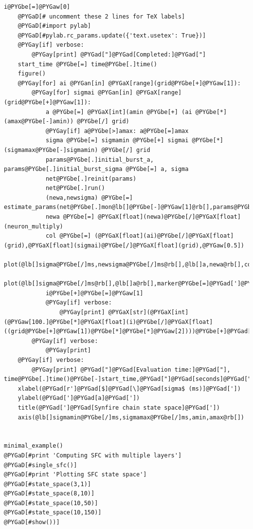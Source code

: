 \documentclass[letterpaper,10pt]{manual}
\begin{document}
\begin{Verbatim}[commandchars=@\[\]]
    i@PYGbe[=]@PYGaw[0]
    @PYGaD[# uncomment these 2 lines for TeX labels]
    @PYGaD[#import pylab]
    @PYGaD[#pylab.rc_params.update({'text.usetex': True})]
    @PYGay[if] verbose:
        @PYGay[print] @PYGad["]@PYGad[Completed:]@PYGad["]
    start_time @PYGbe[=] time@PYGbe[.]time()
    figure()
    @PYGay[for] ai @PYGan[in] @PYGaX[range](grid@PYGbe[+]@PYGaw[1]):
        @PYGay[for] sigmai @PYGan[in] @PYGaX[range](grid@PYGbe[+]@PYGaw[1]):
            a @PYGbe[=] @PYGaX[int](amin @PYGbe[+] (ai @PYGbe[*] (amax@PYGbe[-]amin)) @PYGbe[/] grid)
            @PYGay[if] a@PYGbe[>]amax: a@PYGbe[=]amax
            sigma @PYGbe[=] sigmamin @PYGbe[+] sigmai @PYGbe[*] (sigmamax@PYGbe[-]sigmamin) @PYGbe[/] grid
            params@PYGbe[.]initial_burst_a, params@PYGbe[.]initial_burst_sigma @PYGbe[=] a, sigma
            net@PYGbe[.]reinit(params)
            net@PYGbe[.]run()
            (newa,newsigma) @PYGbe[=] estimate_params(net@PYGbe[.]mon@lb[]@PYGbe[-]@PYGaw[1]@rb[],params@PYGbe[.]initial_burst_t)
            newa @PYGbe[=] @PYGaX[float](newa)@PYGbe[/]@PYGaX[float](neuron_multiply)
            col @PYGbe[=] (@PYGaX[float](ai)@PYGbe[/]@PYGaX[float](grid),@PYGaX[float](sigmai)@PYGbe[/]@PYGaX[float](grid),@PYGaw[0.5])
            plot(@lb[]sigma@PYGbe[/]ms,newsigma@PYGbe[/]ms@rb[],@lb[]a,newa@rb[],color@PYGbe[=]col)
            plot(@lb[]sigma@PYGbe[/]ms@rb[],@lb[]a@rb[],marker@PYGbe[=]@PYGad[']@PYGad[.]@PYGad['],color@PYGbe[=]col,markersize@PYGbe[=]@PYGaw[15])
            i@PYGbe[+]@PYGbe[=]@PYGaw[1]
            @PYGay[if] verbose:
                @PYGay[print] @PYGaX[str](@PYGaX[int](@PYGaw[100.]@PYGbe[*]@PYGaX[float](i)@PYGbe[/]@PYGaX[float]((grid@PYGbe[+]@PYGaw[1])@PYGbe[*]@PYGbe[*]@PYGaw[2])))@PYGbe[+]@PYGad["]@PYGad[%]@PYGad["],
        @PYGay[if] verbose:
            @PYGay[print]
    @PYGay[if] verbose:
        @PYGay[print] @PYGad["]@PYGad[Evaluation time:]@PYGad["], time@PYGbe[.]time()@PYGbe[-]start_time,@PYGad["]@PYGad[seconds]@PYGad["]
    xlabel(@PYGad[r']@PYGad[$]@PYGad[\]@PYGad[sigma$ (ms)]@PYGad['])
    ylabel(@PYGad[']@PYGad[a]@PYGad['])
    title(@PYGad[']@PYGad[Synfire chain state space]@PYGad['])
    axis(@lb[]sigmamin@PYGbe[/]ms,sigmamax@PYGbe[/]ms,amin,amax@rb[])


minimal_example()
@PYGaD[#print 'Computing SFC with multiple layers']
@PYGaD[#single_sfc()]
@PYGaD[#print 'Plotting SFC state space']
@PYGaD[#state_space(3,1)]
@PYGaD[#state_space(8,10)]
@PYGaD[#state_space(10,50)]
@PYGaD[#state_space(10,150)]
@PYGaD[#show())]
\end{Verbatim}
\end{document}
